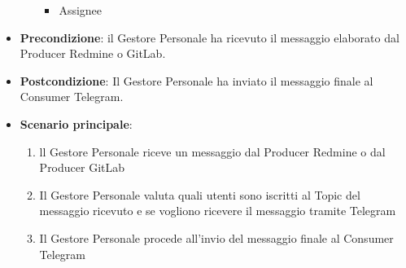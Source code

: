 \begin{itemize}
\begin{itemize}
\begin{itemize}
				\item Assignee
			\end{itemize}
		\end{itemize}
		\item \textbf{Precondizione}: il Gestore Personale ha ricevuto il messaggio elaborato dal Producer Redmine o GitLab.
		\item \textbf{Postcondizione}: Il Gestore Personale ha inviato il messaggio finale al Consumer Telegram.
		\item \textbf{Scenario principale}: 
		\begin{enumerate}
			\item ll Gestore Personale riceve un messaggio dal Producer Redmine o dal Producer GitLab
			\item Il Gestore Personale valuta quali utenti sono iscritti al Topic del messaggio ricevuto e se vogliono ricevere il messaggio tramite Telegram
			\item Il Gestore Personale procede all'invio del messaggio finale al Consumer Telegram
		\end{enumerate}
		
	\end{itemize}